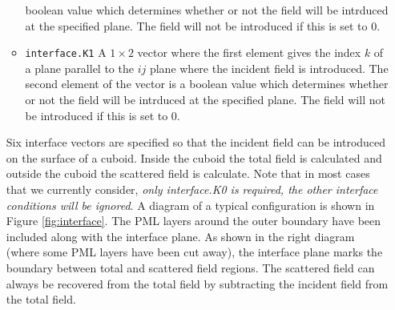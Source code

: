 \documentclass[a4paper, 12pt]{article}
\begin{document}
\begin{itemize}
\begin{itemize}
			boolean value which determines whether or not the field will be
			intrduced at the specified plane. The field will not be introduced
			if this is set to 0.
			\item \verb+interface.K1+ A $1\times 2$ vector where the first element
			gives the index $k$ of a plane parallel to the $ij$ plane where the
			incident field is introduced. The second element of the vector is a
			boolean value which determines whether or not the field will be
			intrduced at the specified plane. The field will not be introduced
			if this is set to 0.
		\end{itemize}
		\label{sec:cuboid}
		Six interface vectors are specified so that the incident field can be
		introduced on the surface of a cuboid. Inside the cuboid the total
		field is calculated and outside the cuboid the scattered field is
		calculate. Note that in most cases that we currently consider,
		\emph{only interface.K0 is required, the other interface
			conditions will be ignored}.  A diagram of a typical configuration
		is shown in Figure \ref{fig:interface}. The PML layers around the
		outer boundary have been included along with the interface
		plane. As shown in the right diagram (where some PML layers have been
		cut away), the interface plane marks the boundary between total and
		scattered field regions. The scattered field can always be recovered
		from the total field
		by subtracting the incident field from the total field.



\end{itemize}
\end{document}
